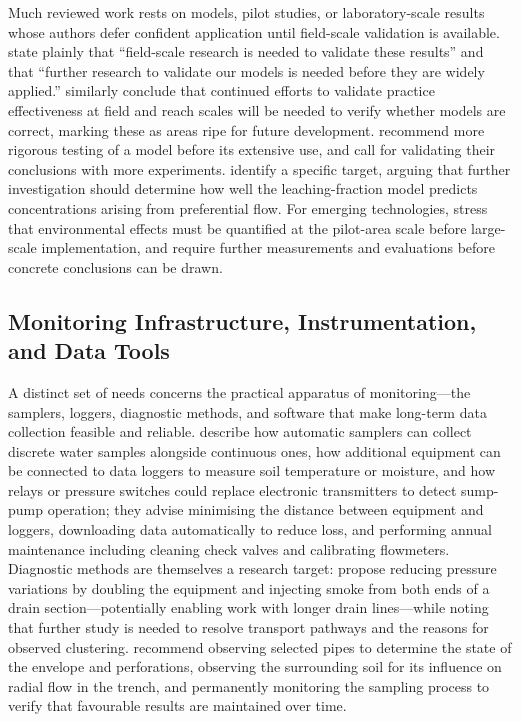 Much reviewed work rests on models, pilot studies, or laboratory-scale results whose authors defer confident application until field-scale validation is available. \textcite{Mitchell2025} state plainly that ``field-scale research is needed to validate these results'' and that ``further research to validate our models is needed before they are widely applied.'' \textcite{Kalcic2018} similarly conclude that continued efforts to validate practice effectiveness at field and reach scales will be needed to verify whether models are correct, marking these as areas ripe for future development. \textcite{Garmdareh2018} recommend more rigorous testing of a model before its extensive use, and \textcite{Yu2016} call for validating their conclusions with more experiments. \textcite{SHALIT1995} identify a specific target, arguing that further investigation should determine how well the leaching-fraction model predicts concentrations arising from preferential flow. For emerging technologies, \textcite{DarziNaftchali2018b} stress that environmental effects must be quantified at the pilot-area scale before large-scale implementation, and \textcite{GUPTA1993} require further measurements and evaluations before concrete conclusions can be drawn.

\subsection{Monitoring Infrastructure, Instrumentation, and Data Tools}

A distinct set of needs concerns the practical apparatus of monitoring---the samplers, loggers, diagnostic methods, and software that make long-term data collection feasible and reliable. \textcite{Kanwar1999} describe how automatic samplers can collect discrete water samples alongside continuous ones, how additional equipment can be connected to data loggers to measure soil temperature or moisture, and how relays or pressure switches could replace electronic transmitters to detect sump-pump operation; they advise minimising the distance between equipment and loggers, downloading data automatically to reduce loss, and performing annual maintenance including cleaning check valves and calibrating flowmeters. Diagnostic methods are themselves a research target: \textcite{Petersen2012} propose reducing pressure variations by doubling the equipment and injecting smoke from both ends of a drain section---potentially enabling work with longer drain lines---while noting that further study is needed to resolve transport pathways and the reasons for observed clustering. \textcite{MartínezBeltrán2007} recommend observing selected pipes to determine the state of the envelope and perforations, observing the surrounding soil for its influence on radial flow in the trench, and permanently monitoring the sampling process to verify that favourable results are maintained over time.

